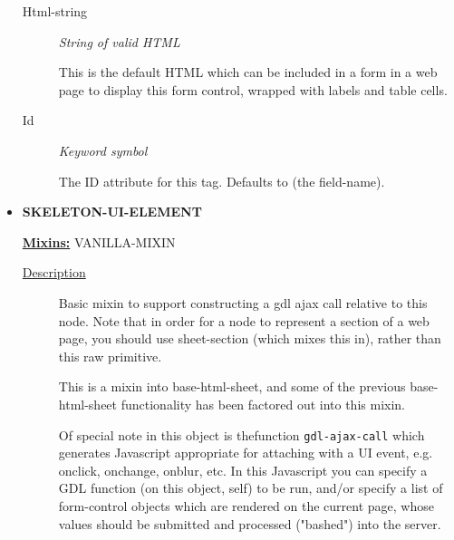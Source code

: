 \documentclass [11pt]{book}
\begin{document}
\begin{itemize}
\begin{description}
\item [Html-string]
\emph{String of valid HTML}

 This is the default HTML which can be included in a form in a web page to display this form control, wrapped with labels and table cells.




\item [Id]
\emph{Keyword symbol}

 The ID attribute for this tag. Defaults to (the field-name).




\end{description}







\item {}
\textbf{SKELETON-UI-ELEMENT}


\textbf{
\underline{Mixins:}} VANILLA-MIXIN





\begin{description}

\item [
\underline{Description}]


Basic mixin to support constructing a gdl ajax call 
relative to this node. Note that in order for a node to represent a section of a 
web page, you should use sheet-section (which mixes this in), rather than this raw 
primitive. 

This is a mixin into base-html-sheet, and some of the previous base-html-sheet 
functionality has been factored out into this mixin. 

Of special note in this object is thefunction \texttt{gdl-ajax-call} which generates 
Javascript appropriate for attaching with a UI event, e.g. onclick, onchange, 
onblur, etc. In this Javascript you can specify a GDL function (on this object, self) 
to be run, and/or specify a list of form-control objects which are rendered on 
the current page, whose values should be submitted and processed ("bashed") into the 
server.



\end{description}




\begin{figure}
\begin{lrbox}{\boxedverb}
\begin{minipage}{\linewidth}
{\small

}
\end{minipage}
\end{lrbox}
\end{figure}
\end{itemize}
\end{document}
